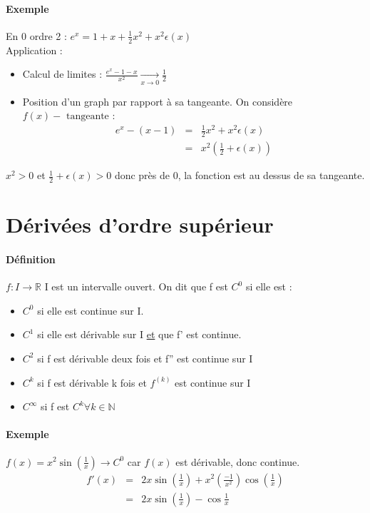 \paragraph{Exemple} En $0$ ordre 2 : $e^x = 1+x+\frac{1}{2}x^2+x^2\epsilon (x)$ ~\\
Application : 
\begin{itemize}
	\item Calcul de limites : $\frac{e^x-1-x}{x^2} \xrightarrow[x \to 0]{} \frac{1}{2}$
	\item Position d'un graph par rapport à sa tangeante. On considère $f(x) - \text{ tangeante }$: \[\begin{array}{rcl}
		e^x - (x-1) &=& \frac{1}{2}x^2 + x^2 \epsilon(x) \\
											   &=& x^2(\frac{1}{2}+\epsilon(x))
\end{array}\]
\end{itemize}

$x^2 > 0$ et $\frac{1}{2} + \epsilon (x) > 0$ donc près de 0, la fonction est au dessus de sa tangeante.

\section{Dérivées d'ordre supérieur}

\paragraph{Définition} $f : I \rightarrow \mathbb{R}$ I est un intervalle ouvert.
On dit que f est $C^0$ si elle est : 
\begin{itemize}
	\item $C^0$ si elle est continue sur I.
	\item $C^1$ si elle est dérivable sur I \ul{et} que f' est continue.
	\item $C^2$ si f est dérivable deux fois et f'' est continue sur I
	\item $C^k$ si f est dérivable k fois et $f^{(k)}$ est continue sur I
	\item $C^\infty$ si f est $C^k \forall k \in \mathbb{N}$
\end{itemize}

\paragraph{Exemple}

$f(x)=x^2\sin(\frac{1}{x}) \rightarrow C^0$ car $f(x)$ est dérivable, donc continue.
\[\begin{array}{rcl}
		f'(x) &=& 2x \sin(\frac{1}{x})+x^2(\frac{-1}{x^2})\cos(\frac{1}{x}) \\
					   &=& 2x\sin(\frac{1}{x}) - \cos\frac{1}{x}
\end{array}\]

